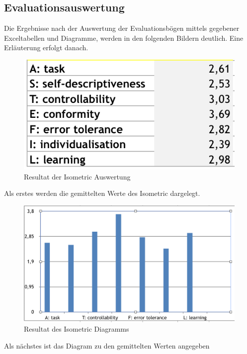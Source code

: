 \documentclass[runningheads,a4paper, 12pt]{llncs}
\begin{document}
\subsection{Evaluationsauswertung}
Die Ergebnisse nach der Auswertung der Evaluationsbögen mittels gegebener Exceltabellen und Diagramme, werden in den folgenden Bildern deutlich. Eine Erläuterung erfolgt danach.

\begin{figure}[H]
	\centering
	\includegraphics[angle=0,scale=1]{iso_metric_result}
	\caption{Resultat der Isometric Auswertung}
	\label{fig:result1}
\end{figure}
Als erstes werden die gemittelten Werte des Isometric dargelegt.

\begin{figure}[H]
	\centering
	\includegraphics[angle=0,scale=0.6]{iso_metric_diagram}
	\caption{Resultat des Isometric Diagramms}
	\label{fig:result2}
\end{figure}
Als nächstes ist das Diagram zu den gemittelten Werten angegeben
\end{document}
